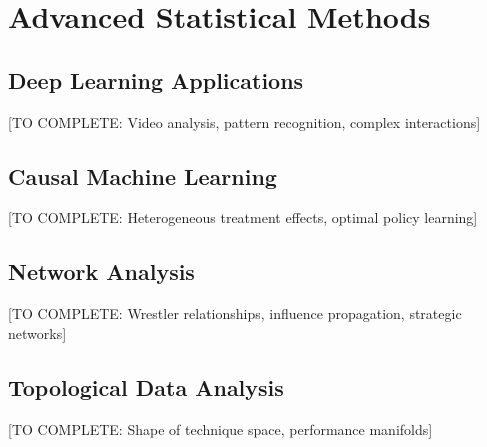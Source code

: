 \section{Advanced Statistical Methods}

\subsection{Deep Learning Applications}

[TO COMPLETE: Video analysis, pattern recognition, complex interactions]

\subsection{Causal Machine Learning}

[TO COMPLETE: Heterogeneous treatment effects, optimal policy learning]

\subsection{Network Analysis}

[TO COMPLETE: Wrestler relationships, influence propagation, strategic networks]

\subsection{Topological Data Analysis}

[TO COMPLETE: Shape of technique space, performance manifolds]